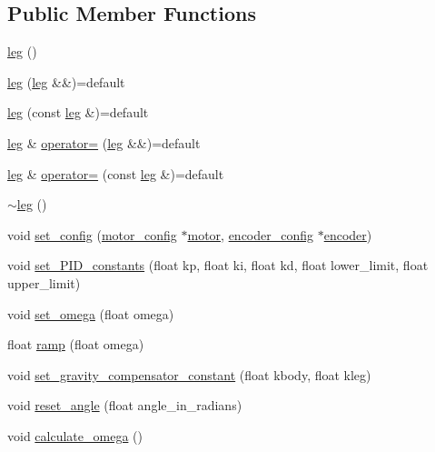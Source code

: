 \subsection*{Public Member Functions}
\begin{DoxyCompactItemize}
\item 
\mbox{\hyperlink{classleg_a418877dece641560d83d01fa236ec8a4}{leg}} ()
\item 
\mbox{\hyperlink{classleg_a880c3eda57ee576b1c091e09c8679096}{leg}} (\mbox{\hyperlink{classleg}{leg}} \&\&)=default
\item 
\mbox{\hyperlink{classleg_a855f8b6bb7b32343290bddf9b7af2ab1}{leg}} (const \mbox{\hyperlink{classleg}{leg}} \&)=default
\item 
\mbox{\hyperlink{classleg}{leg}} \& \mbox{\hyperlink{classleg_a4fe626ec8260c58442d0bf4f6e092e57}{operator=}} (\mbox{\hyperlink{classleg}{leg}} \&\&)=default
\item 
\mbox{\hyperlink{classleg}{leg}} \& \mbox{\hyperlink{classleg_ad689d8f971733486c26cc2df5b740bc2}{operator=}} (const \mbox{\hyperlink{classleg}{leg}} \&)=default
\item 
\mbox{\hyperlink{classleg_abdce802c51dbf118f404973d796dd2d3}{$\sim$leg}} ()
\item 
void \mbox{\hyperlink{classleg_aa2d623fc4e7182491a8fdc9d1d21b378}{set\+\_\+config}} (\mbox{\hyperlink{structmotor__config}{motor\+\_\+config}} $\ast$\mbox{\hyperlink{classmotor}{motor}}, \mbox{\hyperlink{structencoder__config}{encoder\+\_\+config}} $\ast$\mbox{\hyperlink{classencoder}{encoder}})
\item 
void \mbox{\hyperlink{classleg_ad783f2af37d09757d3c997f081d12aaf}{set\+\_\+\+P\+I\+D\+\_\+constants}} (float kp, float ki, float kd, float lower\+\_\+limit, float upper\+\_\+limit)
\item 
void \mbox{\hyperlink{classleg_a0b0845622d8b17f34739b390846bf957}{set\+\_\+omega}} (float omega)
\item 
float \mbox{\hyperlink{classleg_a1e9f431f413985c7ea307fc13fc5b42f}{ramp}} (float omega)
\item 
void \mbox{\hyperlink{classleg_a2ef282bddb5ac1f2583a3230782c59fd}{set\+\_\+gravity\+\_\+compensator\+\_\+constant}} (float kbody, float kleg)
\item 
void \mbox{\hyperlink{classleg_add86097d69f6780c1c651693aac6fa4e}{reset\+\_\+angle}} (float angle\+\_\+in\+\_\+radians)
\item 
void \mbox{\hyperlink{classleg_a79d1ecb4f9726e93192d77e596259905}{calculate\+\_\+omega}} ()
\item 

\end{DoxyCompactItemize}
